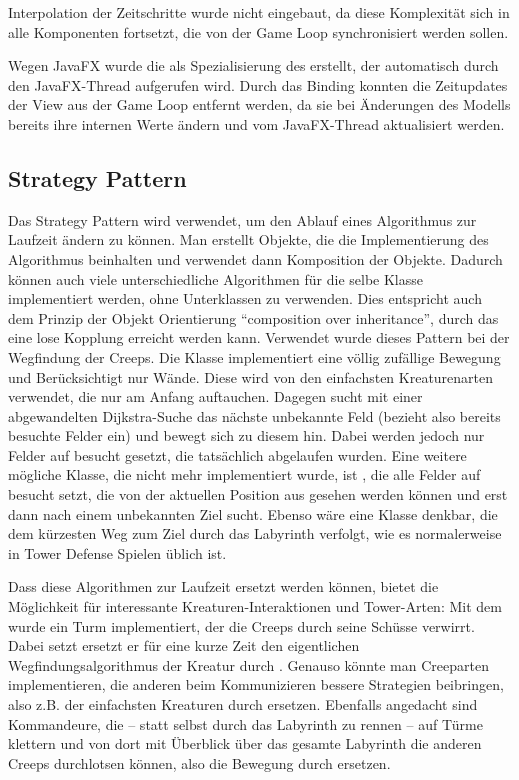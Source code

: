 Interpolation der Zeitschritte wurde nicht eingebaut, da diese Komplexität sich in alle Komponenten fortsetzt, die von der Game Loop synchronisiert werden sollen.

Wegen JavaFX wurde die  als Spezialisierung des  erstellt, der automatisch durch den JavaFX-Thread aufgerufen wird. Durch das Binding konnten die Zeitupdates der View aus der Game Loop entfernt werden, da sie bei Änderungen des Modells bereits ihre internen Werte ändern und vom JavaFX-Thread aktualisiert werden.

\subsection{Strategy Pattern} %
\label{sub:strategy_pattern}
Das Strategy Pattern wird verwendet, um den Ablauf eines Algorithmus zur Laufzeit ändern zu können. Man erstellt Objekte, die die Implementierung des Algorithmus beinhalten und verwendet dann Komposition der Objekte. Dadurch können auch viele unterschiedliche Algorithmen für die selbe Klasse implementiert werden, ohne Unterklassen zu verwenden. Dies entspricht auch dem Prinzip der Objekt Orientierung \enquote{composition over inheritance}, durch das eine lose Kopplung erreicht werden kann. Verwendet wurde dieses Pattern bei der Wegfindung der Creeps. Die Klasse  implementiert eine völlig zufällige Bewegung und Berücksichtigt nur Wände. Diese wird von den einfachsten Kreaturenarten verwendet, die nur am Anfang auftauchen. Dagegen sucht  mit einer abgewandelten Dijkstra-Suche das nächste unbekannte Feld (bezieht also bereits besuchte Felder ein) und bewegt sich zu diesem hin. Dabei werden jedoch nur Felder auf besucht gesetzt, die tatsächlich abgelaufen wurden. Eine weitere mögliche Klasse, die nicht mehr implementiert wurde, ist , die alle Felder auf besucht setzt, die von der aktuellen Position aus gesehen werden können und erst dann nach einem unbekannten Ziel sucht. Ebenso wäre eine Klasse  denkbar, die dem kürzesten Weg zum Ziel durch das Labyrinth verfolgt, wie es normalerweise in Tower Defense Spielen üblich ist.


Dass diese Algorithmen zur Laufzeit ersetzt werden können, bietet die Möglichkeit für interessante Kreaturen-Interaktionen und Tower-Arten: Mit dem  wurde ein Turm implementiert, der die Creeps durch seine Schüsse verwirrt. Dabei setzt ersetzt er für eine kurze Zeit den eigentlichen Wegfindungsalgorithmus der Kreatur durch . Genauso könnte man Creeparten implementieren, die anderen beim Kommunizieren bessere Strategien beibringen, also z.B.  der einfachsten Kreaturen durch  ersetzen. Ebenfalls angedacht sind Kommandeure, die -- statt selbst durch das Labyrinth zu rennen -- auf Türme klettern und von dort mit Überblick über das gesamte Labyrinth die anderen Creeps durchlotsen können, also die Bewegung durch  ersetzen. 

